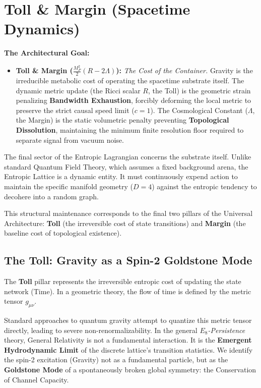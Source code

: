 \section{Toll \& Margin (Spacetime Dynamics)}
\label{sec:toll_margin}

\textbf{The Architectural Goal:}
\begin{itemize}
    \item \textbf{Toll \& Margin ($\frac{M_P^2}{2}(R - 2\Lambda)$):} \textit{The Cost of the Container.} Gravity is the irreducible metabolic cost of operating the spacetime substrate itself. The dynamic metric update (the Ricci scalar $R$, the Toll) is the geometric strain penalizing \textbf{Bandwidth Exhaustion}, forcibly deforming the local metric to preserve the strict causal speed limit ($c=1$). The Cosmological Constant ($\Lambda$, the Margin) is the static volumetric penalty preventing \textbf{Topological Dissolution}, maintaining the minimum finite resolution floor required to separate signal from vacuum noise.
\end{itemize}

The final sector of the Entropic Lagrangian concerns the substrate itself. Unlike standard Quantum Field Theory, which assumes a fixed background arena, the Entropic Lattice is a dynamic entity. It must continuously expend action to maintain the specific manifold geometry ($D=4$) against the entropic tendency to decohere into a random graph.

This structural maintenance corresponds to the final two pillars of the Universal Architecture: \textbf{Toll} (the irreversible cost of state transitions) and \textbf{Margin} (the baseline cost of topological existence).

\subsection{The Toll: Gravity as a Spin-2 Goldstone Mode}
The \textbf{Toll} pillar represents the irreversible entropic cost of updating the state network (Time). In a geometric theory, the flow of time is defined by the metric tensor $g_{\mu\nu}$. 

Standard approaches to quantum gravity attempt to quantize this metric tensor directly, leading to severe non-renormalizability. In the general \textit{$E_8$-Persistence} theory, General Relativity is not a fundamental interaction. It is the \textbf{Emergent Hydrodynamic Limit} of the discrete lattice's transition statistics. We identify the spin-2 excitation (Gravity) not as a fundamental particle, but as the \textbf{Goldstone Mode} of a spontaneously broken global symmetry: the Conservation of Channel Capacity.

